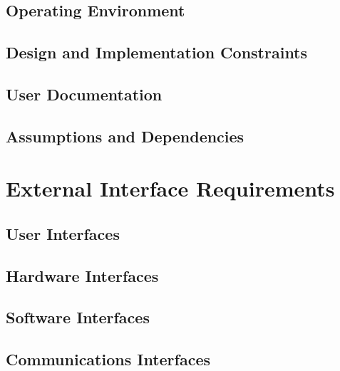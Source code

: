         \section{Operating Environment}
            
        \section{Design and Implementation Constraints}
            
        \section{User Documentation}
            
        \section{Assumptions and Dependencies}
            
    

    \chapter{External Interface Requirements}\label{ch:External Interface Requirements}
        \section{User Interfaces}
            
        \section{Hardware Interfaces}
            
        \section{Software Interfaces}
            
        \section{Communications Interfaces}
            
    

